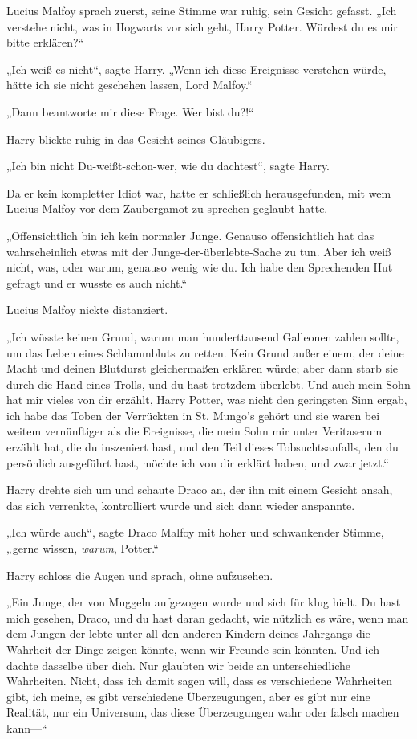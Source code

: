 {Lucius Malfoy sprach zuerst, seine Stimme war ruhig, sein Gesicht gefasst. „Ich verstehe nicht, was in Hogwarts vor sich geht, Harry Potter. Würdest du es mir bitte erklären?“

„Ich weiß es nicht“, sagte Harry. „Wenn ich diese Ereignisse verstehen würde, hätte ich sie nicht geschehen lassen, Lord Malfoy.“

„Dann beantworte mir diese Frage. Wer bist du?!“

Harry blickte ruhig in das Gesicht seines Gläubigers.

„Ich bin nicht Du-weißt-schon-wer, wie du dachtest“, sagte Harry.

Da er kein kompletter Idiot war, hatte er schließlich herausgefunden, mit wem Lucius Malfoy vor dem Zaubergamot zu sprechen geglaubt hatte.

„Offensichtlich bin ich kein normaler Junge. Genauso offensichtlich hat das wahrscheinlich etwas mit der Junge-der-überlebte-Sache zu tun. Aber ich weiß nicht, was, oder warum, genauso wenig wie du. Ich habe den Sprechenden Hut gefragt und er wusste es auch nicht.“

Lucius Malfoy nickte distanziert.

„Ich wüsste keinen Grund, warum man hunderttausend Galleonen zahlen sollte, um das Leben eines Schlammbluts zu retten. Kein Grund außer einem, der deine Macht und deinen Blutdurst gleichermaßen erklären würde; aber dann starb sie durch die Hand eines Trolls, und du hast trotzdem überlebt. Und auch mein Sohn hat mir vieles von dir erzählt, Harry Potter, was nicht den geringsten Sinn ergab, ich habe das Toben der Verrückten in St. Mungo's gehört und sie waren bei weitem vernünftiger als die Ereignisse, die mein Sohn mir unter Veritaserum erzählt hat, die du inszeniert hast, und den Teil dieses Tobsuchtsanfalls, den du persönlich ausgeführt hast, möchte ich von dir erklärt haben, und zwar jetzt.“

Harry drehte sich um und schaute Draco an, der ihn mit einem Gesicht ansah, das sich verrenkte, kontrolliert wurde und sich dann wieder anspannte.

„Ich würde auch“, sagte Draco Malfoy mit hoher und schwankender Stimme, „gerne wissen, \emph{warum}, Potter.“

Harry schloss die Augen und sprach, ohne aufzusehen.

„Ein Junge, der von Muggeln aufgezogen wurde und sich für klug hielt. Du hast mich gesehen, Draco, und du hast daran gedacht, wie nützlich es wäre, wenn man dem Jungen-der-lebte unter all den anderen Kindern deines Jahrgangs die Wahrheit der Dinge zeigen könnte, wenn wir Freunde sein könnten. Und ich dachte dasselbe über dich. Nur glaubten wir beide an unterschiedliche Wahrheiten. Nicht, dass ich damit sagen will, dass es verschiedene Wahrheiten gibt, ich meine, es gibt verschiedene Überzeugungen, aber es gibt nur eine Realität, nur ein Universum, das diese Überzeugungen wahr oder falsch machen kann—“

}

